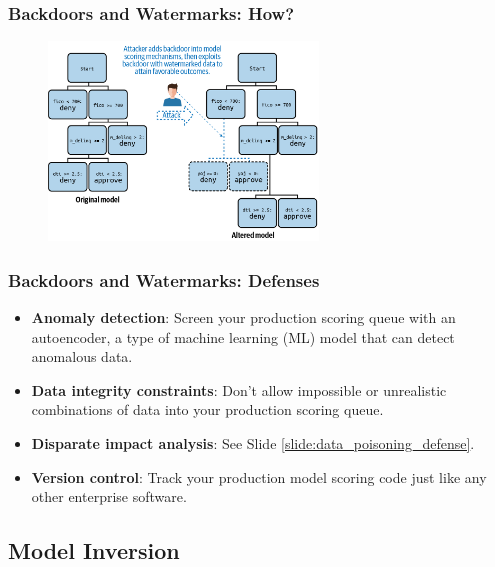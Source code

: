 \documentclass[11pt,
               aspectratio=169,
               hyperref={colorlinks}
               ]{beamer}
\begin{document}
			\begin{frame}
		
				\frametitle{Backdoors and Watermarks: \textbf{How?}}		
			
				\begin{figure}[htb]
					\begin{center}
						\includegraphics[height=150pt]{../img/backdoor.png}
					\end{center}
				\end{figure}	
			

			\end{frame}
		
			\begin{frame}[label={slide:watermark_defense}]
		
				\frametitle{Backdoors and Watermarks: \textbf{Defenses}}
				\begin{itemize}
				\item \textbf{Anomaly detection}: Screen your production scoring queue with an autoencoder, a type of machine learning (ML) model that can detect anomalous data. 
				\item \textbf{Data integrity constraints}: Don’t allow impossible or unrealistic combinations of data into your production scoring queue.
				\item \textbf{Disparate impact analysis}: See Slide \ref{slide:data_poisoning_defense}.
				\item \textbf{Version control}: Track your production model scoring code just like any other enterprise software.
				\end{itemize}
				
			\end{frame}


		\subsection{Model Inversion}
			
\end{document}
